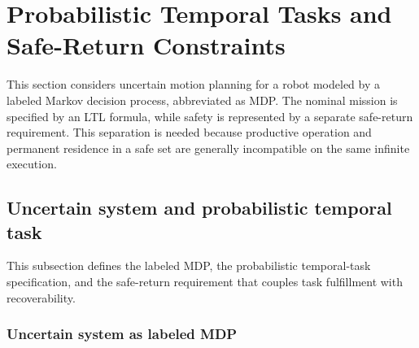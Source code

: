 \section{Probabilistic Temporal Tasks and Safe-Return Constraints}
\label{ch06:sec:ch06_safe_plan}

This section considers uncertain motion planning for a robot modeled by a
labeled Markov decision process, abbreviated as MDP. The nominal mission is
specified by an LTL formula, while safety is represented by a separate
safe-return requirement. This separation is needed because productive operation
and permanent residence in a safe set are generally incompatible on the same
infinite execution. 

\subsection{Uncertain system and probabilistic temporal task}
\label{ch06:sec:problem-formulate}

This subsection defines the labeled MDP, the probabilistic temporal-task
specification, and the safe-return requirement that couples task fulfillment
with recoverability.

\subsubsection{Uncertain system as labeled MDP}
\label{ch06:subsec:probMDP}

